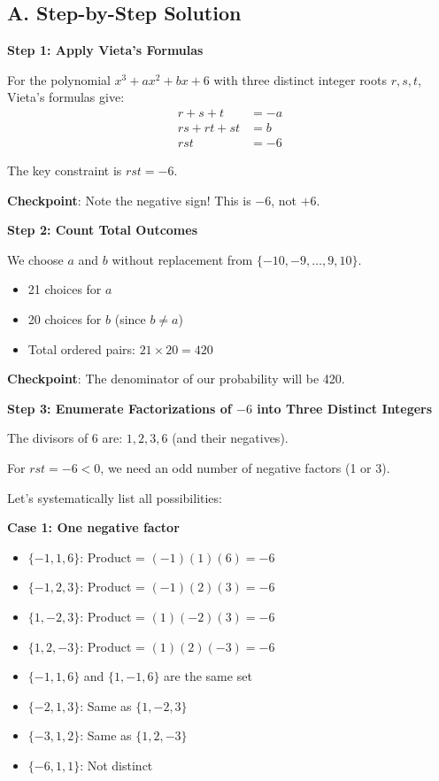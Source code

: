 \documentclass[12pt]{article}
\begin{document}
\begin{solutionbox}
\subsection*{A. Step-by-Step Solution}

\textbf{Step 1: Apply Vieta's Formulas}

For the polynomial $x^3 + ax^2 + bx + 6$ with three distinct integer roots $r, s, t$, Vieta's formulas give:
\begin{align*}
    r + s + t &= -a \\
    rs + rt + st &= b \\
    rst &= -6
\end{align*}

The key constraint is $rst = -6$.

\textbf{Checkpoint}: Note the negative sign! This is $-6$, not $+6$.

\vspace{0.3cm}

\textbf{Step 2: Count Total Outcomes}

We choose $a$ and $b$ without replacement from $\{-10, -9, \ldots, 9, 10\}$.
\begin{itemize}
    \item 21 choices for $a$
    \item 20 choices for $b$ (since $b \neq a$)
    \item Total ordered pairs: $21 \times 20 = 420$
\end{itemize}

\textbf{Checkpoint}: The denominator of our probability will be 420.

\vspace{0.3cm}

\textbf{Step 3: Enumerate Factorizations of $-6$ into Three Distinct Integers}

The divisors of 6 are: $1, 2, 3, 6$ (and their negatives).

For $rst = -6 < 0$, we need an odd number of negative factors (1 or 3).

Let's systematically list all possibilities:

\textbf{Case 1: One negative factor}

\begin{itemize}
    \item $\{-1, 1, 6\}$: Product = $(-1)(1)(6) = -6$ \checkmark
    \item $\{-1, 2, 3\}$: Product = $(-1)(2)(3) = -6$ \checkmark
    \item $\{1, -2, 3\}$: Product = $(1)(-2)(3) = -6$ \checkmark
    \item $\{1, 2, -3\}$: Product = $(1)(2)(-3) = -6$ \checkmark
    \item $\{-1, 1, 6\}$ and $\{1, -1, 6\}$ are the same set
    \item $\{-2, 1, 3\}$: Same as $\{1, -2, 3\}$
    \item $\{-3, 1, 2\}$: Same as $\{1, 2, -3\}$
    \item $\{-6, 1, 1\}$: Not distinct
\end{itemize}


\end{solutionbox}
\end{document}

